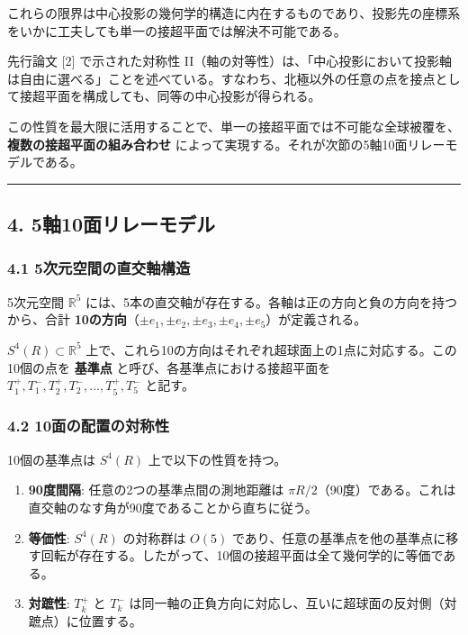 \documentclass[a4paper,11pt]{ltjsarticle}
\begin{document}
これらの限界は中心投影の幾何学的構造に内在するものであり、投影先の座標系をいかに工夫しても単一の接超平面では解決不可能である。

先行論文 {[}2{]} で示された対称性
II（軸の対等性）は、「中心投影において投影軸は自由に選べる」ことを述べている。すなわち、北極以外の任意の点を接点として接超平面を構成しても、同等の中心投影が得られる。

この性質を最大限に活用することで、単一の接超平面では不可能な全球被覆を、\textbf{複数の接超平面の組み合わせ}
によって実現する。それが次節の5軸10面リレーモデルである。

\begin{center}\rule{0.5\linewidth}{0.5pt}\end{center}

\subsection{4.
5軸10面リレーモデル}\label{ux8ef810ux9762ux30eaux30ecux30fcux30e2ux30c7ux30eb}

\subsubsection{4.1
5次元空間の直交軸構造}\label{ux6b21ux5143ux7a7aux9593ux306eux76f4ux4ea4ux8ef8ux69cbux9020}

5次元空間 \(\mathbb{R}^5\)
には、5本の直交軸が存在する。各軸は正の方向と負の方向を持つから、合計
\textbf{10の方向}（\(\pm e_1, \pm e_2, \pm e_3, \pm e_4, \pm e_5\)）が定義される。

\(S^4(R) \subset \mathbb{R}^5\)
上で、これら10の方向はそれぞれ超球面上の1点に対応する。この10個の点を
\textbf{基準点} と呼び、各基準点における接超平面を
\(T_1^+, T_1^-, T_2^+, T_2^-, \ldots, T_5^+, T_5^-\) と記す。

\subsubsection{4.2
10面の配置の対称性}\label{ux9762ux306eux914dux7f6eux306eux5bfeux79f0ux6027}

10個の基準点は \(S^4(R)\) 上で以下の性質を持つ。

\begin{enumerate}
\def\labelenumi{\arabic{enumi}.}
\item
  \textbf{90度間隔}: 任意の2つの基準点間の測地距離は
  \(\pi R / 2\)（90度）である。これは直交軸のなす角が90度であることから直ちに従う。
\item
  \textbf{等価性}: \(S^4(R)\) の対称群は \(O(5)\)
  であり、任意の基準点を他の基準点に移す回転が存在する。したがって、10個の接超平面は全て幾何学的に等価である。
\item
  \textbf{対蹠性}: \(T_k^+\) と \(T_k^-\)
  は同一軸の正負方向に対応し、互いに超球面の反対側（対蹠点）に位置する。
\end{enumerate}
\end{document}
